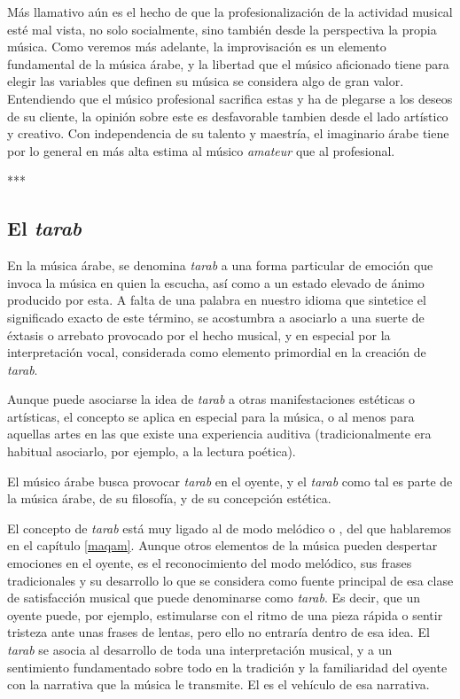    Más llamativo aún es el hecho de que la profesionalización de la actividad musical esté mal vista, no solo socialmente, sino también desde la perspectiva la propia música. Como veremos más adelante, la improvisación es un elemento fundamental de la música árabe, y la libertad que el músico aficionado tiene para elegir las variables que definen su música se considera algo de gran valor. Entendiendo que el músico profesional sacrifica estas y ha de plegarse a los deseos de su cliente, la opinión sobre este es desfavorable tambien desde el lado artístico y creativo. Con independencia de su talento y maestría, el imaginario árabe tiene por lo general en más alta estima al músico \emph{amateur} que al profesional.

    ***

    \subsection{El \emph{tarab}}

    En la música árabe, se denomina \emph{tarab} a una forma particular de emoción que invoca la música en quien la escucha, así como a un estado elevado de ánimo producido por esta. A falta de una palabra en nuestro idioma que sintetice el significado exacto de este término, se acostumbra a asociarlo a una suerte de éxtasis o arrebato provocado por el hecho musical, y en especial por la interpretación vocal, considerada como elemento primordial en la creación de \emph{tarab}.

    Aunque puede asociarse la idea de \emph{tarab} a otras manifestaciones estéticas o artísticas, el concepto se aplica en especial para la música, o al menos para aquellas artes en las que existe una experiencia auditiva (tradicionalmente era habitual asociarlo, por ejemplo, a la lectura poética).

    El músico árabe busca provocar \emph{tarab} en el oyente, y el \emph{tarab} como tal es parte de la música árabe, de su filosofía, y de su concepción estética.

    El concepto de \emph{tarab} está muy ligado al de modo melódico o \maqam, del que hablaremos en el capítulo \ref{maqam}. Aunque otros elementos de la música pueden despertar emociones en el oyente, es el reconocimiento del modo melódico, sus frases tradicionales y su desarrollo lo que se considera como fuente principal de esa clase de satisfacción musical que puede denominarse como \emph{tarab}. Es decir, que un oyente puede, por ejemplo, estimularse con el ritmo de una pieza rápida o sentir tristeza ante unas frases de lentas, pero ello no entraría dentro de esa idea. El \emph{tarab} se asocia al desarrollo de toda una interpretación musical, y a un sentimiento fundamentado sobre todo en la tradición y la familiaridad del oyente con la narrativa que la música le transmite. El \maqam es el vehículo de esa narrativa.

